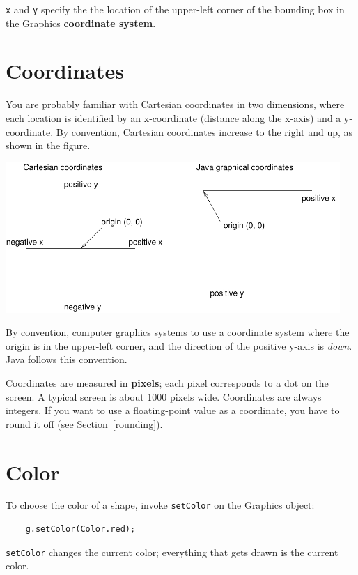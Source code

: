 \documentclass[12pt]{book}
\theoremstyle{exercise}
\begin{document}
{\tt x} and {\tt y} specify the
the location of the upper-left corner
of the bounding box in the Graphics
{\bf coordinate system}.


\section{Coordinates}

You are probably familiar with Cartesian coordinates in two
dimensions, where each location is identified by an x-coordinate
(distance along the x-axis) and a y-coordinate.  By convention,
Cartesian coordinates increase to the right and up, as shown in the
figure.


\includegraphics[width=5in]{figs/coordinates.pdf}


By convention, computer graphics systems to use a
coordinate system where the origin is in the
upper-left corner, and the direction of the
positive y-axis is {\em down}.  Java follows this convention.


Coordinates are measured in {\bf pixels}; each pixel corresponds to
a dot on the screen.  A typical screen is about
1000 pixels wide.  Coordinates are always integers.  If you want to
use a floating-point value as a coordinate, you have to round it off
(see Section~\ref{rounding}).


\section{Color}

To choose the color of a shape, invoke {\tt setColor} on the Graphics
object:

\begin{lstlisting}
    g.setColor(Color.red);
\end{lstlisting}
%
{\tt setColor} changes the current color; everything that gets drawn
is the current color.
\end{document}
